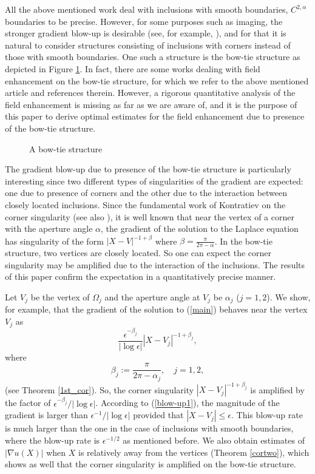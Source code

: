 \documentclass[11pt,a4paper]{article}
\numberwithin{equation}{section}
\newcommand{\eqnref}[1]{(\ref {#1})}
\newcommand{\Ga}{\alpha}
\newcommand{\Gb}{\beta}
\newcommand{\Ge}{\epsilon}
\newcommand{\GO}{\Omega}
\newcommand{\beq}{\begin{equation}}
\newcommand{\eeq}{\end{equation}}
\begin{document}
All the above mentioned work deal with inclusions with smooth boundaries, $C^{2,\Ga}$ boundaries to be precise. However, for some purposes such as imaging, the stronger gradient blow-up is desirable (see, for example, \cite{PBFLN}), and for that it is natural to consider structures consisting of inclusions with corners instead of those with smooth boundaries. One such a structure is the bow-tie structure as depicted in Figure \ref{Fig1}. In fact, there are some works dealing with field enhancement on the bow-tie structure, for which we refer to the above mentioned article and references therein. However, a rigorous quantitative analysis of the field enhancement is missing as far as we are aware of, and it is the purpose of this paper to derive optimal estimates for the field enhancement due to presence of the bow-tie structure.

\begin{figure}[h!]
\begin{center}
\end{center}
\caption{A bow-tie structure}\label{Fig1}
\end{figure}


The gradient blow-up due to presence of the bow-tie structure is particularly interesting since two different types of singularities of the gradient are expected: one due to presence of corners and the other due to the interaction between closely located inclusions. Since the fundamental work of Kontratiev \cite{Kondra-TMMS-67} on the corner singularity (see also \cite{Grisvard-book, KMR-book}), it is well known that near the vertex of a corner with the aperture angle $\Ga$, the gradient of the solution to the Laplace equation has singularity of the form $|X-V|^{-1+\Gb}$ where $\Gb = \frac{\pi}{2\pi - \Ga}$. In the bow-tie structure, two vertices are closely located. So one can expect the corner singularity may be amplified due to the interaction of the inclusions. The results of this paper confirm the expectation in a quantitatively precise manner.

Let $V_j$ be the vertex of $\GO_j$ and the aperture angle at $V_j$ be $\Ga_j$ ($j=1,2$). We show, for example, that the gradient of the solution to \eqnref{main} behaves near the vertex $V_j$ as
\beq\label{blow-up1}
\frac{\Ge^{-\Gb_j}}{|\log \Ge|} |X-V_j|^{-1+\Gb_j},
\eeq
where
\beq\label{Gbdef}
\Gb_j := \frac{\pi}{2\pi - \Ga_j}, \quad j=1,2,
\eeq
(see Theorem \ref{1st_cor}). So, the corner singularity $|X-V_j|^{-1+\Gb_j}$ is amplified by the factor of $\Ge^{-\Gb_j}/|\log \Ge|$. According to \eqnref{blow-up1}, the magnitude of the gradient is larger than $\Ge^{-1}/|\log \Ge|$ provided that $|X-V_j| \le \Ge$. This blow-up rate is much larger than the one in the case of inclusions with smooth boundaries, where the blow-up rate is $\Ge^{-1/2}$ as mentioned before. We also obtain estimates of $|\nabla u(X)|$ when $X$ is relatively away from the vertices (Theorem \ref{cortwo}), which shows as well that the corner singularity is amplified on the bow-tie structure.
\end{document}

